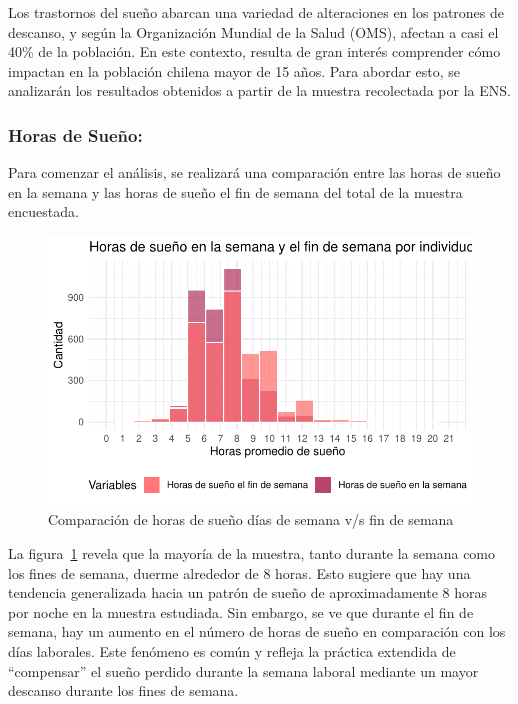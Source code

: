 \documentclass[
  10pt,
  letterpaper,
  DIV=11,
  numbers=noendperiod,
  twocolumn]{scrartcl}
\begin{document}
Los trastornos del sueño abarcan una variedad de alteraciones en los
patrones de descanso, y según la Organización Mundial de la Salud (OMS),
afectan a casi el 40\% de la población. En este contexto, resulta de
gran interés comprender cómo impactan en la población chilena mayor de
15 años. Para abordar esto, se analizarán los resultados obtenidos a
partir de la muestra recolectada por la ENS.

\hypertarget{horas-de-sueuxf1o}{%
\subsubsection{Horas de Sueño:}\label{horas-de-sueuxf1o}}

Para comenzar el análisis, se realizará una comparación entre las horas
de sueño en la semana y las horas de sueño el fin de semana del total de
la muestra encuestada.

\begin{figure}[H]

{\centering \includegraphics{informe_estadistico_files/figure-pdf/fig-f1-1.pdf}

}

\caption{\label{fig-f1}Comparación de horas de sueño días de semana v/s
fin de semana}

\end{figure}

La figura~\ref{fig-f1} revela que la mayoría de la muestra, tanto
durante la semana como los fines de semana, duerme alrededor de 8 horas.
Esto sugiere que hay una tendencia generalizada hacia un patrón de sueño
de aproximadamente 8 horas por noche en la muestra estudiada. Sin
embargo, se ve que durante el fin de semana, hay un aumento en el número
de horas de sueño en comparación con los días laborales. Este fenómeno
es común y refleja la práctica extendida de ``compensar'' el sueño
perdido durante la semana laboral mediante un mayor descanso durante los
fines de semana.
\end{document}
